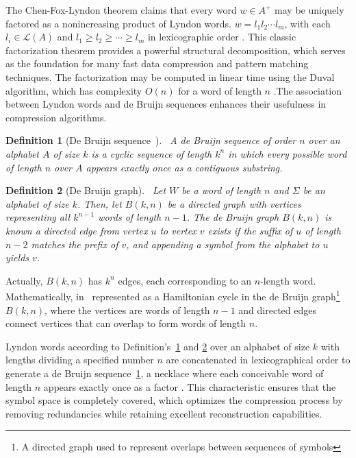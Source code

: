 \documentclass[12pt,a4paper]{article}
\newtheorem{definition}{Definition}
\begin{document}
The Chen-Fox-Lyndon theorem claims that every word $w \in A^+$ may be uniquely factored as a nonincreasing product of Lyndon words.  $w = l_1 l_2 \cdots l_m$, with each $l_i \in \mathcal{L}(A)$ and $l_1 \geq l_2 \geq \cdots \geq l_m$ in lexicographic order \cite{Lothaire}.  This classic factorization theorem provides a powerful structural decomposition, which serves as the foundation for many fast data compression and pattern matching techniques.  The factorization may be computed in linear time using the Duval algorithm, which has complexity $O(n)$ for a word of length $n$ \cite{Duval}.The association between Lyndon words and de Bruijn sequences enhances their usefulness in compression algorithms. 
\begin{definition}[De Bruijn sequence~\cite{deBruijn}]~\label{deBruijnsequence}
A de Bruijn sequence of order $n$ over an alphabet $A$ of size $k$ is a cyclic sequence of length $k^n$ in which every possible word of length $n$ over $A$ appears exactly once as a contiguous substring.
\end{definition}
\begin{definition}[De Bruijn graph]~\label{deBruijngraph}
Let $W$ be a word of length $n$ and $\Sigma$ be an alphabet of size $k$. Then, let $B(k,n)$ be a directed graph with vertices representing all $k^{n-1}$ words of length $n-1$. The de Bruijn graph $B(k,n)$ is known a directed edge from vertex $u$ to vertex $v$ exists if the suffix of $u$ of length $n-2$ matches the prefix of $v$, and appending a symbol from the alphabet to $u$ yields $v$.  
\end{definition}
Actually, $B(k,n)$ has $ k^n$ edges, each corresponding to an $n$-length word. Mathematically, in~\cite{Ruskey} represented as a Hamiltonian cycle in the de Bruijn graph\footnote{A directed graph used to represent overlaps between sequences of symbols} $B(k,n)$, where the vertices are words of length $n-1$ and directed edges connect vertices that can overlap to form words of length $n$.

Lyndon words according to Definition's~\ref{deBruijnsequence} and \ref{deBruijngraph} over an alphabet of size $k$ with lengths dividing a specified number $n$ are concatenated in lexicographical order to generate a de Bruijn sequence~\ref{deBruijnsequence}, a necklace where each conceivable word of length $n$ appears exactly once as a factor \cite{Glen2012}. This characteristic ensures that the symbol space is completely covered, which optimizes the compression process by removing redundancies while retaining excellent reconstruction capabilities.
\end{document}
